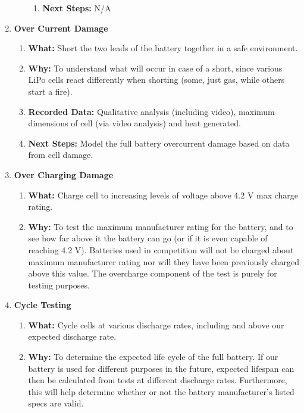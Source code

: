 \documentclass{report}
\begin{document}
\begin{enumerate}
\begin{enumerate}
\begin{enumerate}
                \item \textbf{Next Steps: }N/A
            \end{enumerate}
        \end{enumerate}
        \item \textbf{Over Current Damage}
        \begin{enumerate}
            \item \textbf{What: }Short the two leads of the battery together in a safe environment.
            \item \textbf{Why: }To understand what will occur in case of a short, since various LiPo cells  react differently when shorting (some, just gas, while others start a fire).
            \item \textbf{Recorded Data: }Qualitative analysis (including video), maximum dimensions of cell (via video analysis) and heat generated.
            \item \textbf{Next Steps: }Model the full battery overcurrent damage based on data from cell damage.
        \end{enumerate}
        \item \textbf{Over Charging Damage}
        \begin{enumerate}
            \item \textbf{What: }Charge cell to increasing levels of voltage above 4.2 V max charge rating.
            \item \textbf{Why: }To test the maximum manufacturer rating for the battery, and to see how far above it the battery can go (or if it is even capable of reaching 4.2 V). Batteries used in competition will not be charged about maximum manufacturer rating nor will they have been previously charged above this value. The overcharge component of the test is purely for testing purposes.
        \end{enumerate}
        \item \textbf{Cycle Testing}
        \begin{enumerate}
            \item \textbf{What: }Cycle cells at various discharge rates, including and above our expected discharge rate.
            \item \textbf{Why: }To determine the expected life cycle of the full battery. If our battery is used for different purposes in the future, expected lifespan can then be calculated from tests at different discharge rates. Furthermore, this will help determine whether or not the battery manufacturer’s listed specs are valid.

\end{enumerate}
\end{enumerate}
\end{document}
